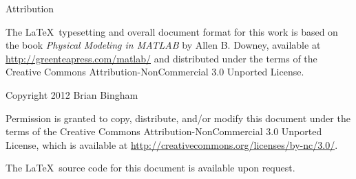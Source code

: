 \documentclass[11pt]{book}
\newcommand{\myreg}{\textsuperscript{{\tiny \textregistered}}}
\newcommand{\thisgls}{temp}  %
\begin{document}
\maketitle

\vspace*{0.2in} %
 
\begin{center}
{\Large \thetitle}

\vspace{0.25in}
Attribution 

\end{center}

The \LaTeX\ typesetting and overall document format for this work is based on the book \emph{Physical Modeling in MATLAB\myreg} by Allen B. Downey, available at \url{http://greenteapress.com/matlab/} and distributed under the terms of the  Creative Commons Attribution-NonCommercial 3.0 Unported License.

\vspace{0.25in}
\begin{center}
Copyright 2012 Brian Bingham
\end{center}

Permission is granted to copy, distribute, and/or modify this document
under the terms of the Creative Commons Attribution-NonCommercial 3.0 Unported
License, which is available at \url{http://creativecommons.org/licenses/by-nc/3.0/}.

The \LaTeX\ source code for this document is available upon request.




\setcounter{tocdepth}{1}
\tableofcontents

\mainmatter

\renewcommand{\thisgls}{linsys}


\printglossary[type=\thisgls]
\glsresetall

%
%


\end{document}
